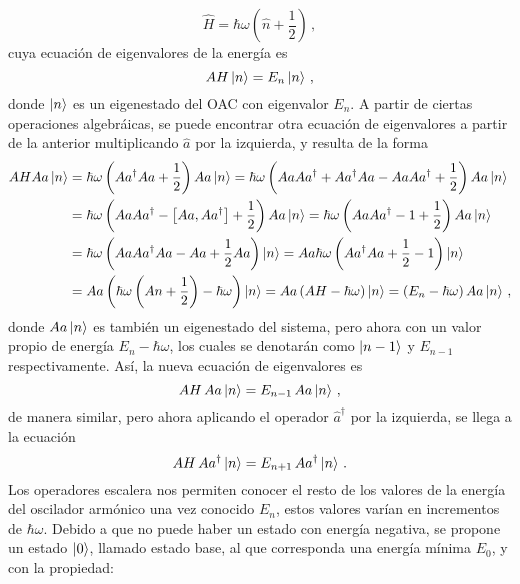 \begin{equation}
\label{OA.13}
\hat{H} = \hbar \omega \left(\hat{n} + \frac{1}{2}\right)\,,
\end{equation}
cuya ecuación de eigenvalores de la energía es
\begin{equation}
\label{OA.14}
A{H} \ket{n} = E_n\ket{n} \,,
\end{equation}
donde $\ket{n}$ es un eigenestado del OAC con eigenvalor $E_n$. A partir de ciertas operaciones algebráicas, se puede encontrar otra ecuación de eigenvalores a partir de la anterior multiplicando $\hat{a}$ por la izquierda, y resulta de la forma
\begin{align*}
A{H} A{a}\ket{n} &= \hbar\omega\left(A{a}^{\dagger}A{a}+\frac{1}{2}\right)A{a}\ket{n} = \hbar\omega\left(A{a}A{a}^{\dagger}+A{a}^{\dagger}A{a}-A{a}A{a}^{\dagger}+\frac{1}{2}\right)A{a}\ket{n} \\
& = \hbar\omega\left(A{a}A{a}^{\dagger}-\left[A{a},A{a}^{\dagger}\right]+\frac{1}{2}\right)A{a}\ket{n} = \hbar\omega\left(A{a}A{a}^{\dagger}-1+\frac{1}{2}\right)A{a}\ket{n}\\
& = \hbar\omega\left(A{a}A{a}^{\dagger}A{a}-A{a}+\frac{1}{2}A{a}\right)\ket{n} = A{a}\hbar\omega\left(A{a}^{\dagger}A{a}+\frac{1}{2}-1\right)\ket{n}\\
& = A{a}\left(\hbar\omega\left(A{n}+\frac{1}{2}\right)-\hbar\omega\right)\ket{n} = A{a}\left(A{H}-\hbar\omega\right)\ket{n} = \left(E_{n}-\hbar\omega\right)A{a}\ket{n}\,,
\end{align*}
donde $A{a}\ket{n}$ es también un eigenestado del sistema, pero ahora con un valor propio de energía $E_n - \hbar\omega$, los cuales se denotarán como $\ket{n-1}$ y $E_{n-1}$ respectivamente. Así, la nueva ecuación de eigenvalores es \cite{Loudon}
\begin{equation}
\label{OA.15}
A{H}\, A{a}\ket{n} = E_{n-1}\, A{a}\ket{n}\,,
\end{equation} %
de manera similar, pero ahora aplicando el operador $\hat{a}^{\dagger}$ por la izquierda, se llega a la ecuación
\begin{equation}
\label{OA.16}
A{H} \,A{a}^{\dagger}\ket{n} = E_{n+1}\, A{a}^{\dagger}\ket{n}\,.
\end{equation}
Los operadores escalera nos permiten conocer el resto de los valores de la energía del oscilador armónico una vez conocido $E_n$, estos valores varían en incrementos de $\hbar\omega$. Debido a que no puede haber un estado con energía negativa, se propone un estado $\ket{0}$, llamado estado base, al que corresponda una energía mínima $E_0$, y con la propiedad:
